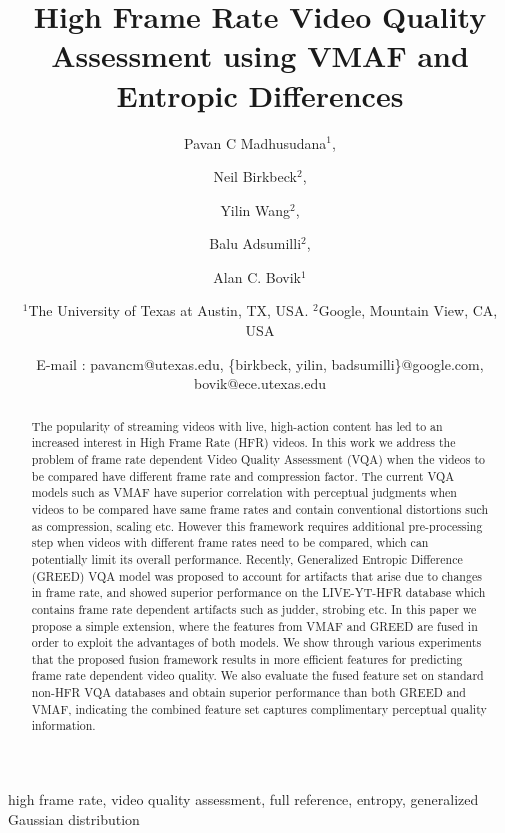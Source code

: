 \documentclass[conference]{IEEEtran}
\begin{document}
\title{High Frame Rate Video Quality Assessment using VMAF and Entropic Differences}
\author{Pavan C Madhusudana$^1$, \and Neil Birkbeck$^2$, \and Yilin Wang$^2$, \and Balu Adsumilli$^2$, \and Alan C. Bovik$^1$ \and
\centerline{$^1$The University of Texas at Austin, TX, USA. $^2$Google, Mountain View, CA, USA} \and \centerline{E-mail : pavancm@utexas.edu, \{birkbeck, yilin, badsumilli\}@google.com, bovik@ece.utexas.edu}}





\maketitle

\begin{abstract}
The popularity of streaming videos with live, high-action content has led to an increased interest in High Frame Rate (HFR) videos. In this work we address the problem of frame rate dependent Video Quality Assessment (VQA) when the videos to be compared have different frame rate and compression factor. The current VQA models such as VMAF have superior correlation with perceptual judgments when videos to be compared have same frame rates and contain conventional distortions such as compression, scaling etc. However this framework requires additional pre-processing step when videos with different frame rates need to be compared, which can potentially limit its overall performance. Recently, Generalized Entropic Difference (GREED) VQA model was proposed to account for artifacts that arise due to changes in frame rate, and showed superior performance on the LIVE-YT-HFR database which contains frame rate dependent artifacts such as judder, strobing etc. In this paper we propose a simple extension, where the features from VMAF and GREED are fused in order to exploit the advantages of both models. We show through various experiments that the proposed fusion framework results in more efficient features for predicting frame rate dependent video quality. We also evaluate the fused feature set on standard non-HFR VQA databases and obtain superior performance than both GREED and VMAF, indicating the combined feature set captures complimentary perceptual quality information. 
\end{abstract}

\begin{IEEEkeywords}
high frame rate, video quality assessment, full reference, entropy, generalized Gaussian distribution
\end{IEEEkeywords}
\end{document}
